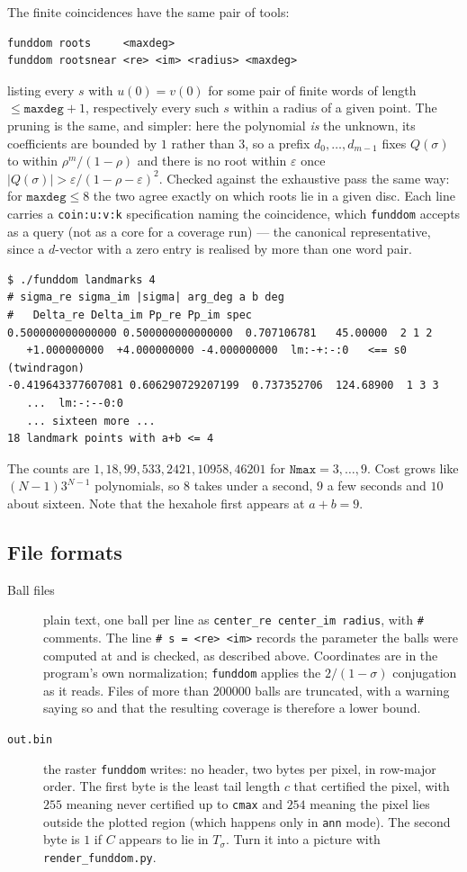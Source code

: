\documentclass{amsart}
\begin{document}
The finite coincidences have the same pair of tools:
\begin{verbatim}
funddom roots     <maxdeg>
funddom rootsnear <re> <im> <radius> <maxdeg>
\end{verbatim}
listing every $s$ with $u(0) = v(0)$ for some pair of finite words of length $\le
\texttt{maxdeg}+1$, respectively every such $s$ within a radius of a given point.  The pruning
is the same, and simpler: here the polynomial \emph{is} the unknown, its coefficients are
bounded by $1$ rather than $3$, so a prefix $d_0,\dots,d_{m-1}$ fixes $Q(\sigma)$ to within
$\rho^m/(1-\rho)$ and there is no root within $\varepsilon$ once
$|Q(\sigma)| > \varepsilon/(1-\rho-\varepsilon)^2$.  Checked against the exhaustive pass the
same way: for $\texttt{maxdeg} \le 8$ the two agree exactly on which roots lie in a given disc.
Each line carries a \texttt{coin:u:v:k} specification naming the coincidence, which
\texttt{funddom} accepts as a query (not as a core for a coverage run) --- the canonical
representative, since a $d$-vector with a zero entry is realised by more than one word pair.
\begin{verbatim}
$ ./funddom landmarks 4
# sigma_re sigma_im |sigma| arg_deg a b deg
#   Delta_re Delta_im Pp_re Pp_im spec
0.500000000000000 0.500000000000000  0.707106781   45.00000  2 1 2
   +1.000000000  +4.000000000 -4.000000000  lm:-+:-:0   <== s0 (twindragon)
-0.419643377607081 0.606290729207199  0.737352706  124.68900  1 3 3
   ...  lm:-:--0:0
   ... sixteen more ...
18 landmark points with a+b <= 4
\end{verbatim}
The counts are $1, 18, 99, 533, 2421, 10958, 46201$ for $\texttt{Nmax} = 3,\ldots,9$.  Cost grows
like $(N-1)3^{N-1}$ polynomials, so $8$ takes under a second, $9$ a few seconds and $10$ about
sixteen.  Note that the hexahole first appears at $a + b = 9$.

\subsection{File formats}

\begin{description}
\item[Ball files] plain text, one ball per line as \texttt{center\_re center\_im radius}, with
\texttt{\#} comments.  The line \verb|# s = <re> <im>| records the parameter the balls were
computed at and is checked, as described above.  Coordinates are in the program's own
normalization; \texttt{funddom} applies the $2/(1-\sigma)$ conjugation as it reads.  Files of more
than 200000 balls are truncated, with a warning saying so and that the resulting coverage is
therefore a lower bound.
\item[\texttt{out.bin}] the raster \texttt{funddom} writes: no header, two bytes per pixel, in
row-major order.  The first byte is the least tail length $c$ that certified the pixel, with
$255$ meaning never certified up to \texttt{cmax} and $254$ meaning the pixel lies outside the
plotted region (which happens only in \texttt{ann} mode).  The second byte is $1$ if $C$ appears
to lie in $T_\sigma$.  Turn it into a picture with \texttt{render\_funddom.py}.
\end{description}
\end{document}
